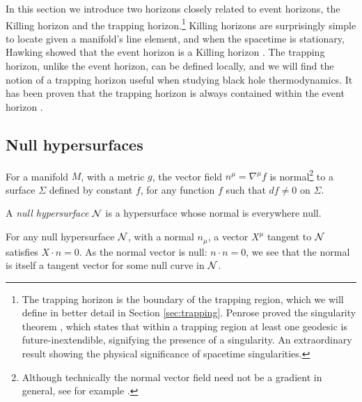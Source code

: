 In this section we introduce two horizons closely related to event horizons, the Killing horizon and the trapping horizon.\footnote{The trapping horizon is the boundary of the trapping region, which we will define in better detail in Section \ref{sec:trapping}. Penrose proved the singularity theorem \cite{Penrose:1964wq}, which states that within a trapping region at least one geodesic is future-inextendible, signifying the presence of a singularity. An extraordinary result showing the physical significance of spacetime singularities.} Killing horizons are surprisingly simple to locate given a manifold's line element, and when the spacetime is stationary, Hawking showed that the event horizon is a Killing horizon \cite{Hawking:1973uf}. The trapping horizon, unlike the event horizon, can be defined locally, and we will find the notion of a trapping horizon useful when studying black hole thermodynamics. It has been proven that the trapping horizon is always contained within the event horizon \cite{Wald:106274}.


\subsection{Null hypersurfaces}

For a manifold $M$, with a metric $g$, the vector field $n^\mu = \nabla^\mu f$ is normal\footnote{Although technically the normal vector field need not be a gradient in general, see for example \cite{LopesCardoso:2019mlj}.} to a surface $\Sigma$ defined by constant $f$, for any function $f$ such that $df \neq 0$ on $\Sigma$. 

\begin{defn}
	A \emph{null hypersurface} ${\cal N}$ is a hypersurface whose normal is everywhere null.
\end{defn}

For any null hypersurface ${\cal N}$, with a normal $n_\mu$, a vector $X^\mu$ tangent to ${\cal N}$ satisfies $X \cdot n = 0$. As the normal vector is null: $n \cdot n = 0$, we see that the normal is itself a tangent vector for some null curve in ${\cal N}$.


